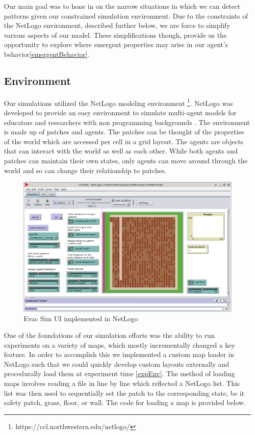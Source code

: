 \documentclass[12pt,letterpaper]{article}
\begin{document}
Our main goal was to hone in on the narrow situations in which we can detect patterns given our constrained simulation environment.  Due to the constraints of the  NetLogo environment, described further below, we are force to simplify various aspects of our model.  These simplifications though, provide us the opportunity to explore where emergent properties may arise in our agent's behavior\ref{emergentBehavior}.


\subsection{Environment} \label{Environment}

Our simulations utilized the NetLogo modeling environment \footnote{https://ccl.northwestern.edu/netlogo/}.  NetLogo was developed to provide an easy environment to simulate multi-agent models for educators and researchers with non programming backgrounds \cite{netlogo}.  The environment is made up of patches and agents.  The patches can be thought of the properties of the world which are accessed per cell in a grid layout.  The agents are objects that can interact with the world as well as each other.  While both agents and patches can maintain their own states, only agents can move around through the world and so can change their relationship to patches.


\begin{figure}[!h]
  \centering
  \includegraphics[width=.75\linewidth]{./figures/fire_sim_ui.png}
  \caption{Evac Sim UI implemented in NetLogo}
\end{figure}

One of the foundations of our simulation efforts was the ability to run experiments on a variety of maps, which mostly incrementally changed a key feature.  In order to accomplish this we implemented a custom map loader in NetLogo such that we could quickly develop custom layouts externally and procedurally load them at experiment time \ref{expEnv}.  The method of loading maps involves reading a file in line by  line which reflected a NetLogo list.  This list was then used to sequentially set the patch to the corresponding state, be it safety patch, grass, floor, or wall.  The code for loading a map is provided below.
\end{document}

